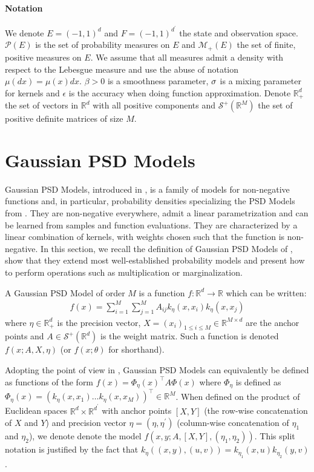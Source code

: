 \paragraph{Notation} We denote $E=(-1, 1)^d$ and $F = (-1, 1)^{d^\prime}$ the state and observation space. $\mathcal P(E)$ is the set of probability measures on $E$ and $\mathcal M_+(E)$ the set of finite, positive measures on $E$. We assume that all measures admit a density with respect to the Lebesgue measure and use the abuse of notation $\mu(dx)=\mu(x)dx$. $\beta>0$ is a smoothness parameter, $\sigma$ is a mixing parameter for kernels and $\epsilon$ is the accuracy when doing function approximation. Denote $\mathbb R^d_+$ the set of vectors in $\mathbb R^d$ with all positive components and $\mathcal S^+(\mathbb R^M)$ the set of positive definite matrices of size $M$.

\section{Gaussian PSD Models}\label{sec:gaussian-psd-models}

Gaussian PSD Models, introduced in \cite{ciliberto2021}, is a family of models for non-negative functions and, in particular, probability densities specializing the PSD Models from \cite{ulysse-non-negative}. They are non-negative everywhere, admit a linear parametrization and can be learned from samples and function evaluations. They are characterized by a linear combination of kernels, with weights chosen such that the function is non-negative. In this section, we recall the definition of Gaussian PSD Models of \cite{ciliberto2021}, show that they extend most well-established probability models and present how to perform operations such as multiplication or marginalization.

\begin{definition}\label{def:psd-model}
   A Gaussian PSD Model of order $M$ is a function $f: \mathbb R^d \to \mathbb R$ which can be written:
   \begin{align}\label{eq:psd-model-def}
      f(x) = \sum_{i=1}^M\sum_{j=1}^M A_{ij}k_\eta(x, x_i)k_\eta(x, x_j)
   \end{align}
   where $\eta \in \mathbb R^d_+$ is the precision vector, $X = (x_i)_{1\leq i \leq M}\in \mathbb R^{M\times d}$ are the anchor points and $A\in\mathcal S^+(\mathbb R^d)$ is the weight matrix. Such a function is denoted $f(x; A, X, \eta)$ (or $f(x;\theta)$ for shorthand).
\end{definition}
Adopting the point of view in \cite{ulysse-non-negative}, Gaussian PSD Models can equivalently be defined as functions of the form $f(x) = \Phi_\eta(x)^\top A\Phi(x)$ where $\Phi_\eta$ is defined as $\Phi_\eta(x)= (k_\eta(x, x_1) \ldots k_\eta(x, x_M))^\top \in\mathbb R^M$.
When defined on the product of Euclidean spaces $\mathbb R^d \times \mathbb R ^{d^\prime}$ with anchor points $[X, Y]$ (the row-wise concatenation of $X$ and $Y$) and precision vector $\eta = (\eta, \eta^\prime)$ (column-wise concatenation of $\eta_1$ and $\eta_2$), we denote denote the model $f(x, y ; A, [X, Y], (\eta_1, \eta_2))$. This split notation is justified by the fact that $k_\eta((x, y), (u, v)) = k_{\eta_1}(x, u)k_{\eta_2}(y, v)$.

